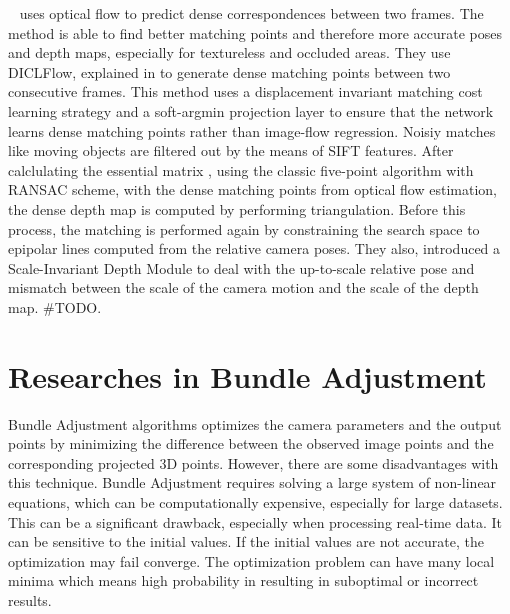 \documentclass[11pt]{article}
\begin{document}
    ~\cite{wang2021deep} uses optical flow to predict dense correspondences between two frames. The method is
    able to find better matching points and therefore more accurate poses and depth maps, especially for
    textureless and occluded areas. They use DICLFlow, explained in \cite{wang2020displacement} to generate
    dense matching points between two consecutive frames. This method uses a displacement invariant matching
    cost learning strategy and a soft-argmin projection layer to ensure that the network learns dense matching
    points rather than image-flow regression. Noisiy matches like moving
    objects are filtered out by the means of SIFT features. After calclulating the essential matrix , using
    the classic five-point algorithm with RANSAC scheme, with the dense matching points from optical flow estimation,
    the dense depth map is computed by performing triangulation. Before this process, the matching is performed
    again by constraining the search space to epipolar lines computed from the relative camera poses. They also,
    introduced a Scale-Invariant Depth Module to deal with the up-to-scale relative pose and mismatch between the
    scale of the camera motion and the scale of the depth map. #TODO.

    \newpage
    \section{Researches in Bundle Adjustment}
    Bundle Adjustment algorithms optimizes the camera parameters and the output points by minimizing the
    difference between the observed image points and the corresponding projected 3D points. However, there
    are some disadvantages with this technique. Bundle Adjustment requires solving a large system of
    non-linear equations, which can be computationally expensive, especially for large datasets. This can be a
    significant drawback, especially when processing real-time data. It can be sensitive to the initial values.
    If the initial values are not accurate, the optimization may fail converge. The optimization problem can have
    many local minima which means high probability in resulting in suboptimal or incorrect results.
\end{document}
